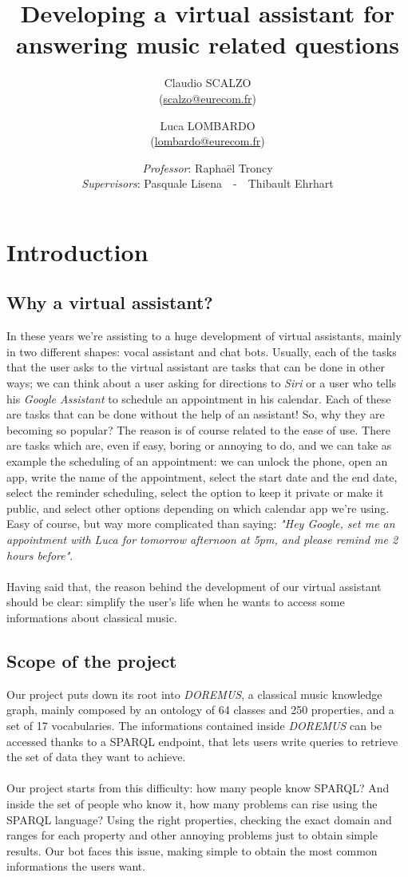 \documentclass[a4paper,12pt]{report}
\title{Developing a virtual assistant for answering music related questions}
\author{Claudio SCALZO \\ (\href{mailto:scalzo@eurecom.fr}{scalzo@eurecom.fr}) \and Luca LOMBARDO \\ (\href{mailto:lombardo@eurecom.fr}{lombardo@eurecom.fr}) }
\date{\textit{Professor}: Raphaël Troncy\\\textit{Supervisors}: Pasquale Lisena~~-~~Thibault Ehrhart}
\begin{document}
\maketitle
\tableofcontents

\chapter{Introduction}
	\section{Why a virtual assistant?}
	In these years we're assisting to a huge development of virtual assistants, mainly in two different shapes: vocal assistant and chat bots. Usually, each of the tasks that the user asks to the virtual assistant are tasks that can be done in other ways; we can think about a user asking for directions to \textit{Siri} or a user who tells his \textit{Google Assistant} to schedule an appointment in his calendar. Each of these are tasks that can be done without the help of an assistant! So, why they are becoming so popular? The reason is of course related to the ease of use. There are tasks which are, even if easy, boring or annoying to do, and we can take as example the scheduling of an appointment: we can unlock the phone, open an app, write the name of the appointment, select the start date and the end date, select the reminder scheduling, select the option to keep it private or make it public, and select other options depending on which calendar app we're using. Easy of course, but way more complicated than saying: \textit{"Hey Google, set me an appointment with Luca for tomorrow afternoon at 5pm, and please remind me 2 hours before"}.\\\\
	Having said that, the reason behind the development of our virtual assistant should be clear: simplify the user's life when he wants to access some informations about classical music.
	
	\section{Scope of the project}
	Our project puts down its root into \textit{DOREMUS}\cite{doremus}, a classical music knowledge graph, mainly composed by an ontology of 64 classes and 250 properties, and a set of 17 vocabularies. The informations contained inside \textit{DOREMUS} can be accessed thanks to a SPARQL endpoint, that lets users write queries to retrieve the set of data they want to achieve.\\\\
	Our project starts from this difficulty: how many people know SPARQL? And inside the set of people who know it, how many problems can rise using the SPARQL language? Using the right properties, checking the exact domain and ranges for each property and other annoying problems just to obtain simple results. Our bot faces this issue, making simple to obtain the most common informations the users want.
	
\end{document}
